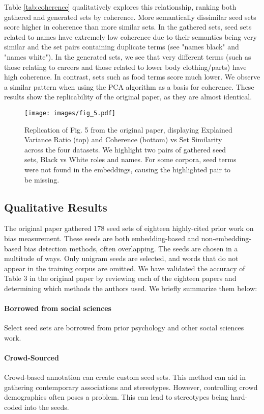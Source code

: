 Table \ref{tab:coherence} qualitatively explores this relationship, ranking both gathered and
generated sets by coherence. More semantically dissimilar seed sets score higher in coherence than
more similar sets. In the gathered sets, seed sets related to names have extremely low coherence due
to their semantics being very similar and the set pairs containing duplicate terms (see "names
black" and "names white"). In the generated sets, we see that very different terms (such as those
relating to careers and those related to lower body clothing/parts) have high coherence. In
contrast, sets such as food terms score much lower. We observe a similar pattern when using the PCA
algorithm as a basis for coherence. These results show the replicability of the original paper, as
they are almost identical.

\begin{figure}[b]
	\centering
	\texttt{[image: images/fig\_5.pdf]}
	\caption{\label{fig:repro_5}Replication of Fig. 5 from the original paper, displaying Explained Variance Ratio (top) and Coherence (bottom) vs Set Similarity across the four datasets. We highlight two pairs of gathered seed sets, Black vs White roles and names. For some corpora, seed terms were not found in the embeddings, causing the highlighted pair to be missing.}
\end{figure}

\subsection{Qualitative Results} The original paper gathered 178 seed sets of eighteen highly-cited
prior work on bias measurement. These seeds are both embedding-based and non-embedding-based bias
detection methods, often overlapping. The seeds are chosen in a multitude of ways. Only unigram
seeds are selected, and words that do not appear in the training corpus are omitted. We have
validated the accuracy of Table 3 in the original paper by reviewing each of the eighteen papers and
determining which methods the authors used. We briefly summarize them below:

\paragraph{Borrowed from social sciences} Select seed sets are borrowed from prior psychology and
other social sciences work.

\paragraph{Crowd-Sourced} Crowd-based annotation can create custom seed sets. This method can aid in
gathering contemporary associations and stereotypes. However, controlling crowd demographics often
poses a problem. This can lead to stereotypes being hard-coded into the seeds.

